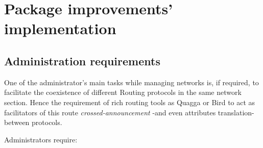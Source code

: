 \chapter{Package improvements' implementation}
\label{ch:implementation}

\section{Administration requirements}
One of the administrator's main tasks while managing networks is, if required, to facilitate the coexistence of different Routing protocols in the same network section. Hence the requirement of rich routing tools as Quagga or Bird to act as facilitators of this route \textit{crossed-announcement} -and even attributes translation- between protocols.

Administrators require:
